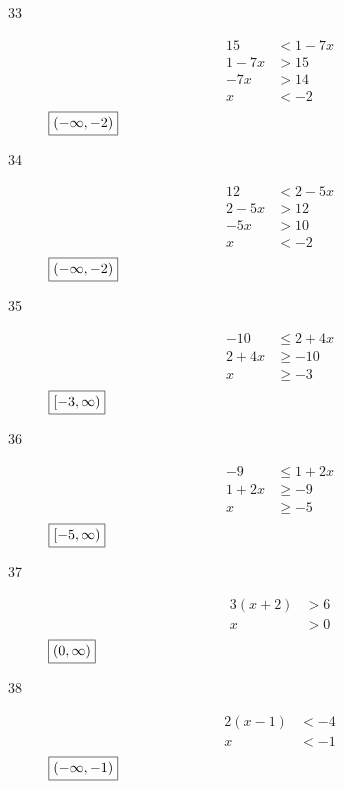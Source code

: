 \documentclass[letterpaper, landscape]{exam}
\begin{document}
\begin{description}
      \item[33]
        \begin{align*}
          15     & < 1 - 7x \\
          1 - 7x & > 15 \\
          -7x    & > 14 \\
          x      & < -2 \\
        \end{align*}
        $\boxed{ \intoo{ -\infty, -2 } }$

      \item[34]
        \begin{align*}
          12     & < 2 - 5x \\
          2 - 5x & > 12 \\
          -5x    & > 10 \\
          x      & < -2 \\
        \end{align*}
        $\boxed{ \intoo{ -\infty, -2 } }$ 

      \item[35]
        \begin{align*}
          -10    & \leq 2 + 4x \\
          2 + 4x & \geq -10 \\
          x      & \geq -3 \\
        \end{align*}
        $\boxed{ \intco{ -3, \infty} }$

      \item[36]
        \begin{align*}
          -9     & \leq 1 + 2x \\
          1 + 2x & \geq -9 \\
          x      & \geq -5 \\
        \end{align*}
        $\boxed{ \intco{ -5, \infty } }$

      \item[37]
        \begin{align*}
          3 (x + 2) & > 6 \\
          x         & > 0 \\
        \end{align*}
        $\boxed{ \intoo{ 0, \infty } }$

      \item[38]
        \begin{align*}
          2 (x - 1) & < -4 \\
          x         & < -1 \\
        \end{align*}
        $\boxed{ \intoo{ -\infty, -1 } }$


\end{description}
\end{document}
